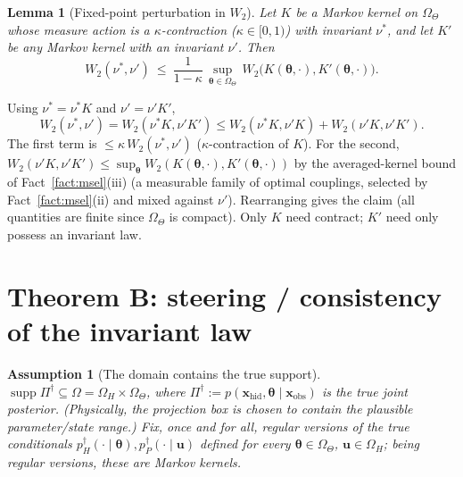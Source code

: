 \documentclass[11pt]{article}
\makeatletter
\theoremstyle{definitionbreak}
\newtheorem{assumption}{Assumption}
\theoremstyle{plainbreak}
\newtheorem{lemma}[theorem]{Lemma}
\theoremstyle{remarkbreak}
\renewenvironment{proof}[1][\proofname]{\par
  \pushQED{\qed}\normalfont
  \topsep6\p@\@plus6\p@\relax
  \trivlist
  \item[\hskip\labelsep\itshape #1\@addpunct{.}]\mbox{}\par\nobreak\ignorespaces
}{\popQED\endtrivlist\@endpefalse}
\newcommand{\Om}{\Omega}
\newcommand{\xobs}{\bm{x}_{\mathrm{obs}}}
\newcommand{\xhid}{\bm{x}_{\mathrm{hid}}}
\newcommand{\bth}{\bm{\theta}}
\makeatother
\begin{document}
\begin{lemma}[Fixed-point perturbation in $W_2$]
\label{lem:perturb}
Let $K$ be a Markov kernel on $\Om_\Theta$ whose measure action is a $\kappa$-contraction
($\kappa\in[0,1)$) with invariant $\nu^\ast$, and let $K'$ be any Markov kernel with an invariant
$\nu'$. Then
\[
  W_2(\nu^\ast,\nu')\ \le\ \frac{1}{1-\kappa}\,\sup_{\bth\in\Om_\Theta}\,W_2\big(K(\bth,\cdot),K'(\bth,\cdot)\big).
\]
\end{lemma}
\begin{proof}
Using $\nu^\ast=\nu^\ast K$ and $\nu'=\nu'K'$,
\[
  W_2(\nu^\ast,\nu')=W_2(\nu^\ast K,\nu'K')\le W_2(\nu^\ast K,\nu'K)+W_2(\nu'K,\nu'K').
\]
The first term is $\le\kappa\,W_2(\nu^\ast,\nu')$ ($\kappa$-contraction of $K$). For the second,
$W_2(\nu'K,\nu'K')\le\sup_{\bth} W_2(K(\bth,\cdot),K'(\bth,\cdot))$ by the averaged-kernel bound of
Fact~\ref{fact:msel}(iii) (a measurable family of optimal couplings, selected by
Fact~\ref{fact:msel}(ii) and mixed against $\nu'$). Rearranging gives the claim (all quantities are
finite since $\Om_\Theta$ is compact). Only $K$ need contract; $K'$ need only possess an invariant
law.
\end{proof}

\section{Theorem B: steering / consistency of the invariant law}
\label{sec:thmB}

\begin{assumption}[The domain contains the true support]
\label{ass:suptrue}
$\operatorname{supp}\Pi^\dagger\subseteq\Om=\Om_H\times\Om_\Theta$, where $\Pi^\dagger:=p(\xhid,\bth\mid\xobs)$
is the true joint posterior. (Physically, the projection box is chosen to contain the plausible
parameter/state range.) Fix, once and for all, regular versions of the true conditionals
$p^\dagger_H(\cdot\mid\bth),p^\dagger_P(\cdot\mid\bm u)$ defined for every $\bth\in\Om_\Theta$,
$\bm u\in\Om_H$; being regular versions, these are Markov kernels.
\end{assumption}
\end{document}
